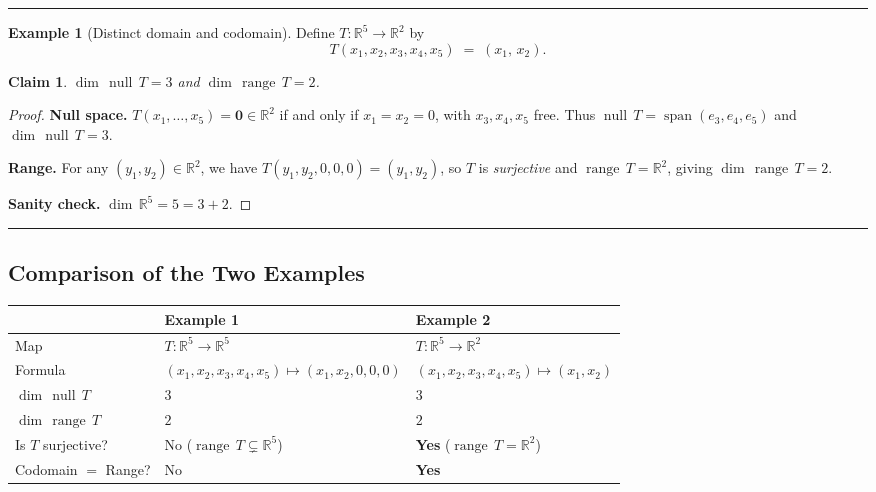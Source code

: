\documentclass[12pt]{article}
\newtheorem*{claim}{Claim}
\theoremstyle{definition}
\newtheorem*{example}{Example}
\theoremstyle{remark}
\newcommand{\R}{\mathbb{R}}
\newcommand{\nullT}{\operatorname{null}}
\newcommand{\range}{\operatorname{range}}
\newcommand{\dime}{\operatorname{dim}}
\begin{document}
\vspace{1em}
\hrule
\vspace{1em}
 
\begin{example}[Distinct domain and codomain]
Define $T : \R^5 \to \R^2$ by
\[
  T(x_1, x_2, x_3, x_4, x_5) \;=\; (x_1,\, x_2).
\]
\end{example}
 
\begin{claim}
$\dime\,\nullT\,T = 3$ and $\dime\,\range\,T = 2$.
\end{claim}
 
\begin{proof}
\textbf{Null space.}
$T(x_1,\ldots,x_5) = \mathbf{0}\in\R^2$ if and only if $x_1 = x_2 = 0$, with
$x_3,x_4,x_5$ free.  Thus $\nullT\,T = \operatorname{span}(e_3,e_4,e_5)$ and
$\dime\,\nullT\,T = 3$.
 
\textbf{Range.}
For any $(y_1,y_2)\in\R^2$, we have $T(y_1,y_2,0,0,0)=(y_1,y_2)$, so $T$ is
\emph{surjective} and $\range\,T = \R^2$, giving $\dime\,\range\,T = 2$.
 
\textbf{Sanity check.}
$\dime\,\R^5 = 5 = 3 + 2$.\;\checkmark
\end{proof}
 
\vspace{1em}
\hrule
\vspace{1em}
 
\subsection*{Comparison of the Two Examples}
 
\begin{center}
\renewcommand{\arraystretch}{1.4}
\begin{tabular}{@{} l >{\centering\arraybackslash}m{3.8cm}
                      >{\centering\arraybackslash}m{3.8cm} @{}}
\toprule
 & \textbf{Example 1} & \textbf{Example 2} \\
\midrule
Map & $T:\R^5\to\R^5$ & $T:\R^5\to\R^2$ \\
Formula & $(x_1,x_2,x_3,x_4,x_5)\mapsto(x_1,x_2,0,0,0)$ & $(x_1,x_2,x_3,x_4,x_5)\mapsto(x_1,x_2)$ \\
$\dime\,\nullT\,T$ & $3$ & $3$ \\
$\dime\,\range\,T$ & $2$ & $2$ \\
Is $T$ surjective? & No \;($\range\,T\subsetneq\R^5$) & \textbf{Yes} \;($\range\,T = \R^2$) \\
Codomain $=$ Range? & No & \textbf{Yes} \\
\bottomrule
\end{tabular}
\end{center}
 
\end{document}
